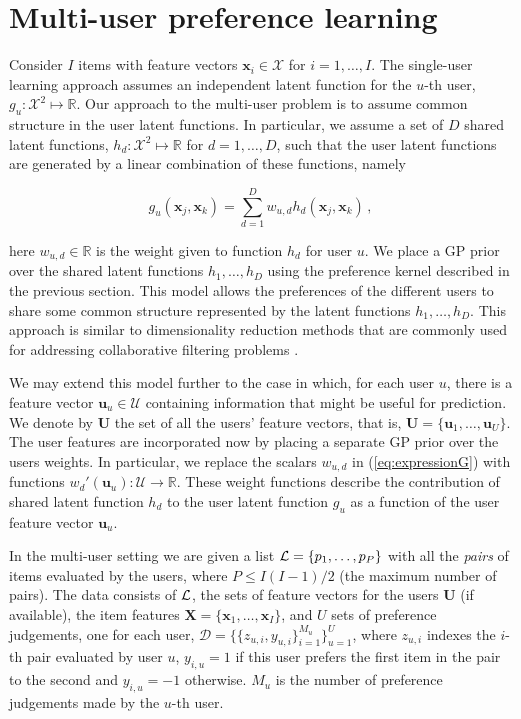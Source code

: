 \section{Multi-user preference learning \label{sec:model}}

Consider $I$ items with feature vectors $\mathbf{x}_i\in\mathcal{X}$ for $i=1,\ldots,I$. 
The single-user learning approach assumes an independent latent function for the $u$-th user,
$g_u:\mathcal{X}^2\mapsto\mathbb{R}$. Our approach to the multi-user problem is to assume common structure
in the user latent functions. In particular, we assume a set of $D$ shared latent functions,
$h_d:\mathcal{X}^2\mapsto \mathbb{R}$ for $d=1,\ldots,D$, such that the user latent functions are 
generated by a linear combination of these functions, namely

\vspace{-0.5cm}
{\small
\begin{equation}
g_{u}(\mathbf{x}_j,\mathbf{x}_k)=\sum_{d=1}^{D}w_{u,d}h_{d}(\mathbf{x}_j,\mathbf{x}_k)\,,\label{eq:expressionG}
\end{equation}
}

\vspace{-0.5cm}
\normalsize here $w_{u,d}\in \mathbb{R}$ is the weight given to function $h_d$ for user $u$.
We place a GP prior over the shared latent functions $h_{1},\ldots,h_{D}$ using the
preference kernel described in the previous section.
This model allows the preferences of the different users to share
some common structure represented by the latent functions $h_{1},\ldots,h_{D}$.
This approach is similar to dimensionality reduction methods that are commonly used for addressing collaborative filtering problems \cite{stern2009,raiko2007}.

We may extend this model further to the case in which, for each user $u$, there is
a feature vector $\mathbf{u}_u \in \mathcal{U}$ containing information that might be useful for prediction.
We denote by $\mathbf{U}$ the set of all the users' feature vectors,
that is, $\mathbf{U} = \{\mathbf{u}_1,\ldots,\mathbf{u}_U\}$.
The user features are incorporated now by placing a separate GP prior over the users weights.
In particular, we replace the scalars $w_{u,d}$ in (\ref{eq:expressionG}) with functions
$w_d'(\mathbf{u}_u):\mathcal{U}\rightarrow\mathcal{\mathbb{R}}$. 
These weight functions describe the contribution of shared latent function
$h_d$ to the user latent function $g_u$ as a function of the user feature vector $\mathbf{u}_u$.

In the multi-user setting we are given a list
$\mathcal{L}=\{p_1,\ldots,p_P\}$ with all the \emph{pairs} of items evaluated by the users, where $P\leq I(I-1)/2$ (the maximum number of pairs).
The data consists of $\mathcal{L}$, the sets of feature vectors for the users $\mathbf{U}$ (if available),
the item features $\mathbf{X}=\{\mathbf{x}_1,\ldots,\mathbf{x}_I\}$, and $U$ sets of preference judgements,
one for each user, $\mathcal{D}=\{\{z_{u,i},y_{u,i}\}_{i=1}^{M_u}\}_{u=1}^{U}$, where $z_{u,i}$ indexes the $i$-th
pair evaluated by user $u$, $y_{i,u}=1$ if this user
prefers the first item in the pair to the second and $y_{i,u}=-1$ otherwise. $M_u$ is the number of 
preference judgements made by the $u$-th user.


